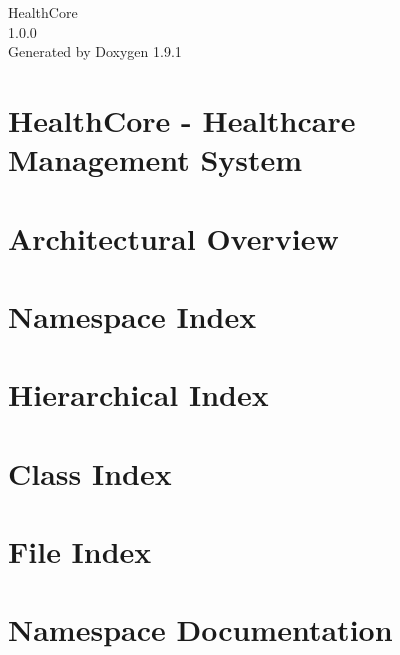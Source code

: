 \let\mypdfximage\pdfximage\def\pdfximage{\immediate\mypdfximage}\documentclass[twoside]{book}
\newcommand{\+}{\discretionary{\mbox{\scriptsize$\hookleftarrow$}}{}{}}
\newcommand{\clearemptydoublepage}{%
  \newpage{\pagestyle{empty}\cleardoublepage}%
}
\begin{document}
\raggedbottom

\hypersetup{pageanchor=false,
             bookmarksnumbered=true,
             pdfencoding=unicode
            }
\begin{titlepage}
\vspace*{7cm}
\begin{center}%
{\Large Health\+Core \\[1ex]\large 1.\+0.\+0 }\\
\vspace*{1cm}
{\large Generated by Doxygen 1.9.1}\\
\end{center}
\end{titlepage}
\clearemptydoublepage
{}
\tableofcontents
\clearemptydoublepage
{}
\hypersetup{pageanchor=true}

\chapter{Health\+Core -\/ Healthcare Management System}
\label{index}\hypertarget{index}{}
\chapter{Architectural Overview}
\label{architecture_page}

\chapter{Namespace Index}

\chapter{Hierarchical Index}

\chapter{Class Index}

\chapter{File Index}

\chapter{Namespace Documentation}




\end{document}
